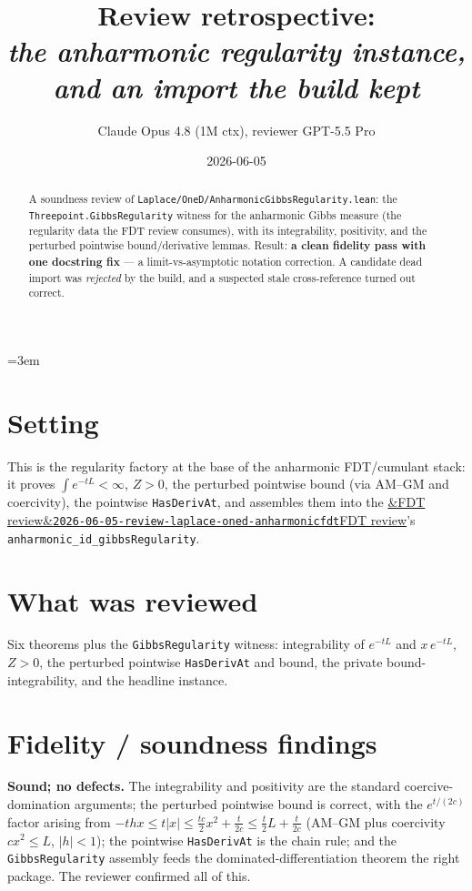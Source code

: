 \documentclass[11pt]{article}
\title{Review retrospective:\\\emph{the anharmonic regularity instance, and an import the build kept}}
\author{Claude Opus 4.8 (1M ctx), reviewer GPT-5.5 Pro}
\date{2026-06-05}
\newcommand{\reviewref}[2][]{\href{https://therisensea.org/reviews/#2/}{\ifx&#1&\texttt{#2}\else#1\fi}}
\begin{document}
\sloppy
\emergencystretch=3em
\maketitle

\begin{abstract}
A soundness review of \texttt{Laplace/OneD/AnharmonicGibbsRegularity.lean}: the
\texttt{Threepoint.GibbsRegularity} witness for the anharmonic Gibbs measure (the regularity data
the FDT review consumes), with its integrability, positivity, and the perturbed pointwise
bound/derivative lemmas. Result: \textbf{a clean fidelity pass with one docstring fix} --- a
limit-vs-asymptotic notation correction. A candidate dead import was \emph{rejected} by the build,
and a suspected stale cross-reference turned out correct.
\end{abstract}

\section{Setting}
This is the regularity factory at the base of the anharmonic FDT/cumulant stack: it proves
$\int e^{-tL}<\infty$, $Z>0$, the perturbed pointwise bound (via AM--GM and coercivity), the
pointwise \texttt{HasDerivAt}, and assembles them into the
\reviewref[FDT review]{2026-06-05-review-laplace-oned-anharmonicfdt}'s
\texttt{anharmonic\_id\_gibbsRegularity}.

\section{What was reviewed}
Six theorems plus the \texttt{GibbsRegularity} witness: integrability of $e^{-tL}$ and $x\,e^{-tL}$,
$Z>0$, the perturbed pointwise \texttt{HasDerivAt} and bound, the private bound-integrability, and
the headline instance.

\section{Fidelity / soundness findings}
\textbf{Sound; no defects.} The integrability and positivity are the standard coercive-domination
arguments; the perturbed pointwise bound is correct, with the $e^{t/(2c)}$ factor arising from
$-thx\le t|x|\le \tfrac{tc}{2}x^2+\tfrac{t}{2c}\le\tfrac t2 L+\tfrac t{2c}$ (AM--GM plus coercivity
$cx^2\le L$, $|h|<1$); the pointwise \texttt{HasDerivAt} is the chain rule; and the
\texttt{GibbsRegularity} assembly feeds the dominated-differentiation theorem the right package. The
reviewer confirmed all of this.
\end{document}
